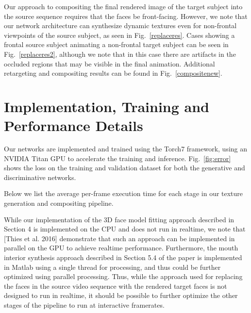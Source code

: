 \documentclass[10pt,twocolumn,letterpaper]{article}
\begin{document}
Our approach to compositing the final rendered image of the target subject into the source sequence requires that the faces be front-facing. However, we note that our network architecture can synthesize dynamic textures even for non-frontal viewpoints of the source subject, as seen in Fig.~\ref{replaceres}. Cases showing a frontal source subject animating a non-frontal target subject can be seen in Fig.~\ref{replaceres2}, although we note that in this case there are artifacts in the occluded regions that may be visible in the final animation. Additional retargeting and compositing results can be found in Fig.~\ref{compositenew}.


\section{Implementation, Training and Performance Details}

Our networks are implemented and trained using the Torch7 framework, using an NVIDIA Titan GPU to accelerate the training and inference. Fig.~\ref{fig:error} shows the loss on the training and validation dataset for both the generative and discriminative networks.

Below we list the average per-frame execution time for each stage in our texture generation and compositing pipeline.

While our implementation of the 3D face model fitting approach described in Section 4 is implemented on the CPU and does not run in realtime, we note that [Thies et al. 2016] demonstrate that such an approach can be implemented in parallel on the GPU to achieve realtime performance. Furthermore, the mouth interior synthesis approach described in Section 5.4 of the paper is implemented in Matlab using a single thread for processing, and thus could be further optimized using parallel processing. Thus, while the approach used for replacing the faces in the source video sequence with the rendered target faces is not designed to run in realtime, it should be possible to further optimize the other stages of the pipeline to run at interactive framerates.


\end{document}
